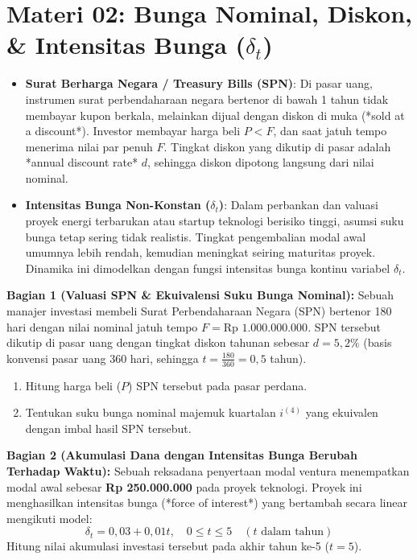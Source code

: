 \documentclass[11pt,a4paper]{article}
\begin{document}
\newpage

\section*{Materi 02: Bunga Nominal, Diskon, \& Intensitas Bunga ($\delta_t$)}

\begin{kasusbox}
\begin{itemize}[leftmargin=4mm, topsep=1pt, itemsep=1pt]
    \item \textbf{Surat Berharga Negara / Treasury Bills (SPN)}: Di pasar uang, instrumen surat perbendaharaan negara bertenor di bawah 1 tahun tidak membayar kupon berkala, melainkan dijual dengan diskon di muka (*sold at a discount*). Investor membayar harga beli $P < F$, dan saat jatuh tempo menerima nilai par penuh $F$. Tingkat diskon yang dikutip di pasar adalah *annual discount rate* $d$, sehingga diskon dipotong langsung dari nilai nominal.
    \item \textbf{Intensitas Bunga Non-Konstan ($\delta_t$)}: Dalam perbankan dan valuasi proyek energi terbarukan atau startup teknologi berisiko tinggi, asumsi suku bunga tetap sering tidak realistis. Tingkat pengembalian modal awal umumnya lebih rendah, kemudian meningkat seiring maturitas proyek. Dinamika ini dimodelkan dengan fungsi intensitas bunga kontinu variabel $\delta_t$.
\end{itemize}
\end{kasusbox}

\begin{soalbox}
\textbf{Bagian 1 (Valuasi SPN \& Ekuivalensi Suku Bunga Nominal):}  
Sebuah manajer investasi membeli Surat Perbendaharaan Negara (SPN) bertenor 180 hari dengan nilai nominal jatuh tempo $F = \text{Rp } 1.000.000.000$. SPN tersebut dikutip di pasar uang dengan tingkat diskon tahunan sebesar $d = 5{,}2\%$ (basis konvensi pasar uang 360 hari, sehingga $t = \frac{180}{360} = 0{,}5$ tahun).
\begin{enumerate}[label=(\alph*), topsep=1pt, itemsep=1pt]
    \item Hitung harga beli ($P$) SPN tersebut pada pasar perdana.
    \item Tentukan suku bunga nominal majemuk kuartalan $i^{(4)}$ yang ekuivalen dengan imbal hasil SPN tersebut.
\end{enumerate}

\textbf{Bagian 2 (Akumulasi Dana dengan Intensitas Bunga Berubah Terhadap Waktu):}  
Sebuah reksadana penyertaan modal ventura menempatkan modal awal sebesar \textbf{Rp 250.000.000} pada proyek teknologi. Proyek ini menghasilkan intensitas bunga (*force of interest*) yang bertambah secara linear mengikuti model:
$$\delta_t = 0{,}03 + 0{,}01t, \quad 0 \le t \le 5 \quad (t \text{ dalam tahun})$$
Hitung nilai akumulasi investasi tersebut pada akhir tahun ke-5 ($t=5$).
\end{soalbox}
\end{document}
